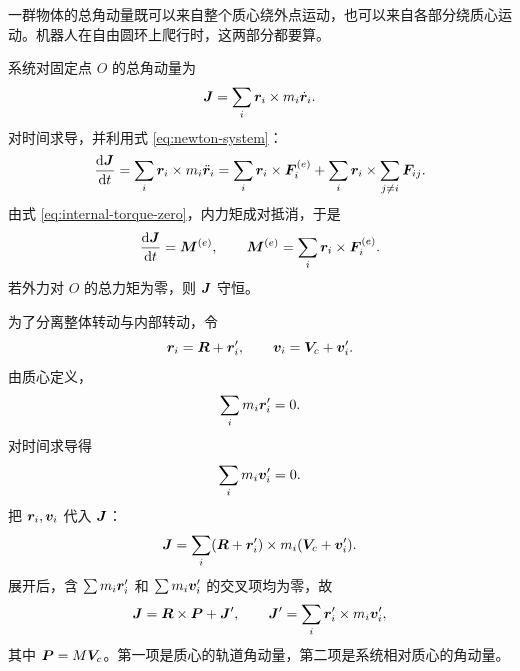 一群物体的总角动量既可以来自整个质心绕外点运动，也可以来自各部分绕质心运动。机器人在自由圆环上爬行时，这两部分都要算。

系统对固定点 $O$ 的总角动量为
\begin{equation}
\boldsymbol{J}=\sum_i\boldsymbol{r}_i\times m_i\dot{\boldsymbol{r}}_i .
\end{equation}
对时间求导，并利用式 \eqref{eq:newton-system}：
\begin{equation}
\frac{\mathrm{d} \boldsymbol{J}}{\mathrm{d} t}
=\sum_i\boldsymbol{r}_i\times m_i\ddot{\boldsymbol{r}}_i
=\sum_i\boldsymbol{r}_i\times\boldsymbol{F}_i^{(e)}
+\sum_i\boldsymbol{r}_i\times\sum_{j\ne i}\boldsymbol{F}_{ij}.
\end{equation}
由式 \eqref{eq:internal-torque-zero}，内力矩成对抵消，于是
\begin{equation}
\frac{\mathrm{d} \boldsymbol{J}}{\mathrm{d} t}=\boldsymbol{M}^{(e)},\qquad
\boldsymbol{M}^{(e)}=\sum_i\boldsymbol{r}_i\times\boldsymbol{F}_i^{(e)}.
\label{eq:sys-ang-ch1}
\end{equation}
若外力对 $O$ 的总力矩为零，则 $\boldsymbol{J}$ 守恒。

为了分离整体转动与内部转动，令
\begin{equation}
\boldsymbol{r}_i=\boldsymbol{R}+\boldsymbol{r}_i',\qquad
\boldsymbol{v}_i=\boldsymbol{V}_c+\boldsymbol{v}_i'.
\end{equation}
由质心定义，
\begin{equation}
\sum_i m_i\boldsymbol{r}_i'=0.
\end{equation}
对时间求导得
\begin{equation}
\sum_i m_i\boldsymbol{v}_i'=0.
\end{equation}
把 $\boldsymbol{r}_i,\boldsymbol{v}_i$ 代入 $\boldsymbol{J}$：
\begin{equation}
\boldsymbol{J}=\sum_i(\boldsymbol{R}+\boldsymbol{r}_i')\times m_i(\boldsymbol{V}_c+\boldsymbol{v}_i').
\end{equation}
展开后，含 $\sum m_i\boldsymbol{r}_i'$ 和 $\sum m_i\boldsymbol{v}_i'$ 的交叉项均为零，故
\begin{equation}
\boldsymbol{J}=\boldsymbol{R}\times\boldsymbol{P}+\boldsymbol{J}',\qquad
\boldsymbol{J}'=\sum_i\boldsymbol{r}_i'\times m_i\boldsymbol{v}_i',
\end{equation}
其中 $\boldsymbol{P}=M\boldsymbol{V}_c$。第一项是质心的轨道角动量，第二项是系统相对质心的角动量。

